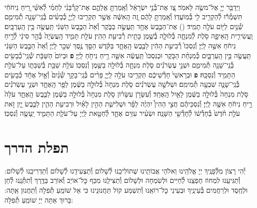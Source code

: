 \documentclass[twoside, openany, parskip=half, 11pt]{book}
\begin{document}
\begin{footnotesize}
\begin{multicols}{2}
\\
וַיְדַבֵּ֥ר יְיָ֖ אֶל־משֶׂ֥ה לֵּאמֹֽר׃ צַ֚ו אֶת־בְּ֯נֵ֣י יִשְׂרָאֵ֔ל וְ֯אָֽמַרְתָּ֖ אֲלֵהֶ֑ם אֶת־קָרְ֯בָּנִ֨י לַחְמִ֜י לְ֯אִשַּׁ֗י רֵ֚יחַ נִֽיחֹחִ֔י תִּשְׁמְ֯ר֕וּ לְ֯הַקְרִ֥יב לִ֖י בְּ֯מֽוֹעֲדֽוֹ׃
וְ֯אָֽמַרְתָּ֣ לָהֶ֔ם זֶ֚ה הָֽאִשֶּׁ֔ה אֲשֶׁ֥ר תַּקְרִ֖יבוּ לַֽיְיָ֑ כְּ֯בָשִׂ֨ים בְּ֯נֵֽי־שָׁנָ֧ה תְ֯מִימִ֛ם שְׁ֯נַ֥יִם לַיּ֖וֹם עֹלָ֥ה תָמִֽיד׃
()
אֶת־הַכֶּ֥בֶשׂ אֶחָ֖ד תַּֽעֲשֶׂ֣ה בַבֹּ֑קֶר וְ֯אֵת֙ הַכֶּ֣בֶשׂ הַשֵּׁנִ֔י תַּֽעֲשֶׂ֖ה בֵּ֥ין הָֽעַרְבָּֽיִם׃ וַֽעֲשִׂירִ֧ית הָֽאֵיפָ֛ה סֹ֖לֶת לְ֯מִנְחָ֑ה בְּ֯לוּלָ֛ה בְּ֯שֶׁ֥מֶן כָּתִ֖ית רְ֯בִיעִ֥ת הַהִֽין׃
עֹלַ֖ת תָּמִ֑יד הָֽעֲשֻׂיָה֙ בְּ֯הַ֣ר סִינַ֔י לְ֯רֵ֣יחַ נִיחֹ֔חַ אִשֶּׁ֖ה לַֽיְיָ׃ וְ֯נִסְכּוֹ֙ רְ֯בִיעִ֥ת הַהִ֔ין לַכֶּ֖בֶשׂ הָֽאֶחָ֑ד בַּקֹּ֗דֶשׁ הַסֵּ֛ךְ נֶ֥סֶךְ שֵׁכָ֖ר לַֽיְיָ׃ וְ֯אֵת֙ הַכֶּ֣בֶשׂ הַשֵּׁנִ֔י תַּֽעֲשֶׂ֖ה בֵּ֣ין הָֽעַרְבָּ֑יִם כְּ֯מִנְחַ֨ת הַבֹּ֤קֶר וּכְנִסְכּוֹ֙ תַּֽעֲשֶׂ֔ה אִשֵּׁ֛ה רֵ֥יחַ נִיחֹ֖חַ לַֽיְיָ׃ \textbf{פ}
וּבְיוֹם֙ הַשַּׁבָּ֔ת שְׁ֯נֵֽי־כְ֯בָשִׂ֥ים בְּ֯נֵֽי־שָׁנָ֖ה תְּ֯מִימִ֑ם וּשְׁנֵ֣י עֶשְׂרֹנִ֗ים סֹ֧לֶת מִנְחָ֛ה בְּ֯לוּלָ֥ה בַשֶּׁ֖מֶן וְ֯נִסְכּֽוֹ׃ עֹלַ֥ת שַׁבַּ֖ת בְּ֯שַׁבַּתּ֑וֹ עַל־עֹלַ֥ת הַתָּמִ֖יד וְ֯נִסְכָּֽהּ׃ \textbf{פ}
וּבְרָאשֵׁי֙ חָדְ֯שֵׁיכֶ֔ם תַּקְרִ֥יבוּ עֹלָ֥ה לַֽיְיָ֑ פָּרִ֨ים בְּ֯נֵֽי־בָקָ֤ר שְׁ֯נַ֨יִם֙ וְ֯אַ֣יִל אֶחָ֔ד כְּ֯בָשִׂ֧ים בְּ֯נֵֽי־שָׁנָ֛ה שִׁבְעָ֖ה תְּ֯מִימִֽם׃ וּשְׁלֹשָׁ֣ה עֶשְׂרֹנִ֗ים סֹ֤לֶת מִנְחָה֙ בְּ֯לוּלָ֣ה בַשֶּׁ֔מֶן לַפָּ֖ר הָֽאֶחָ֑ד וּשְׁנֵ֣י עֶשְׂרֹנִ֗ים סֹ֤לֶת מִנְחָה֙ בְּ֯לוּלָ֣ה בַשֶּׁ֔מֶן לָאַ֖יִל הָֽאֶחָֽד׃ וְ֯עִשָּׂרֹ֣ן עִשָּׂר֗וֹן סֹ֤לֶת מִנְחָה֙ בְּ֯לוּלָ֣ה בַשֶּׁ֔מֶן לַכֶּ֖בֶשׂ הָֽאֶחָ֑ד עֹלָה֙ רֵ֣יחַ נִיחֹ֔חַ אִשֶּׁ֖ה לַֽיְיָ׃ וְ֯נִסְכֵּיהֶ֗ם חֲצִ֣י הַהִין֩ יִהְיֶ֨ה לַפָּ֜ר וּשְׁלִישִׁ֧ת הַהִ֣ין לָאַ֗יִל וּרְבִיעִ֥ת הַהִ֛ין לַכֶּ֖בֶשׂ יָ֑יִן זֹ֣את עֹלַ֥ת חֹ֨דֶשׁ֙ בְּ֯חָדְ֯שׁ֔וֹ לְ֯חָדְ֯שֵׁ֖י הַשָּׁנָֽה׃ וּשְׂעִ֨יר עִזִּ֥ים אֶחָ֛ד לְ֯חַטָּ֖את לַֽיְיָ עַל־עֹלַ֧ת הַתָּמִ֛יד יֵֽעָשֶׂ֖ה וְ֯נִסְכּֽוֹ׃

\end{multicols}

\end{footnotesize}

\chapter{תפלת הדרך}

יְ֯הִי רָצוֹן מִלְּ֯פָנֶֽיךָ יְיָ אֱלֹהֵֽינוּ וֵאלֹהֵי אֲבוֹתֵֽינוּ שֶׁתּוֹלִיכֵֽנוּ לְ֯שָׁלוֹם וְ֯תַצְעִידֵֽנוּ לְ֯שָׁלוֹם וְ֯תַדְרִיכֵֽנוּ לְ֯שָׁלוֹם: וְ֯תַגִּיעֵֽנוּ לִמְחוֹז חֶפְצֵֽנוּ לְ֯חַיִּים וּלְשִׂמְחָה וּלְשָׁלוֹם וְ֯תַצִּילֵֽנוּ מִכַּף כׇּל־אוֹיֵב וְ֯אוֹרֵב בַּדֶּֽרֶךְ וְ֯תִתְּ֯נֵֽנוּ לְ֯חֵן וּלְחֶֽסֶד וּלְרַחֲמִים בְּ֯עֵינֶֽיךָ וּבְעֵינֵי כׇל־רוֹאֵֽנוּ וְ֯תִשְׁמַע קוֹל תַּחֲנוּנֵֽינוּ כִּי אֵל שׁוֹמֵֽעַ תְּ֯פִלָה וְ֯תַחֲנוּן אַֽתָּה: בָּרוּךְ אַתָּה יְיָ שׁוֹמֵֽעַ תְּ֯פִלָּה:\\

\clearpage

\blankpage
\end{document}
